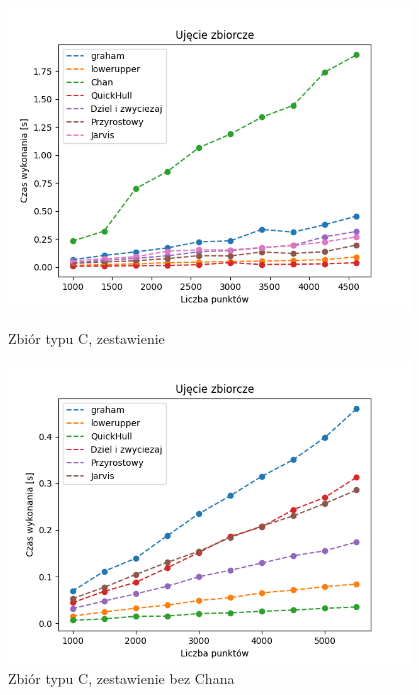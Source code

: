 \documentclass[11pt]{article}
\theoremstyle{remark} \newtheorem{definition}{def.}
\theoremstyle{definition} \newtheorem{twierdzenie}{tw.}
\begin{document}
\begin{figure}[]
    \centering
    \begin{minipage}{0.5\textwidth}
        \centering
        \includegraphics[width=0.95\textwidth]{../tests/prost-zbiorczy.png} %
        \caption{Zbiór typu C, zestawienie}
        \label{fig:prost-zbiorczy}
    \end{minipage}\hfill
    \begin{minipage}{0.5\textwidth}
        \centering
        \includegraphics[width=0.95\textwidth]{../tests/prost-zbiorczy-2.png} %
        \caption{Zbiór typu C, zestawienie bez Chana}
        \label{fig:prost-zbiorczy-2}
    \end{minipage}
\end{figure}
\end{document}
